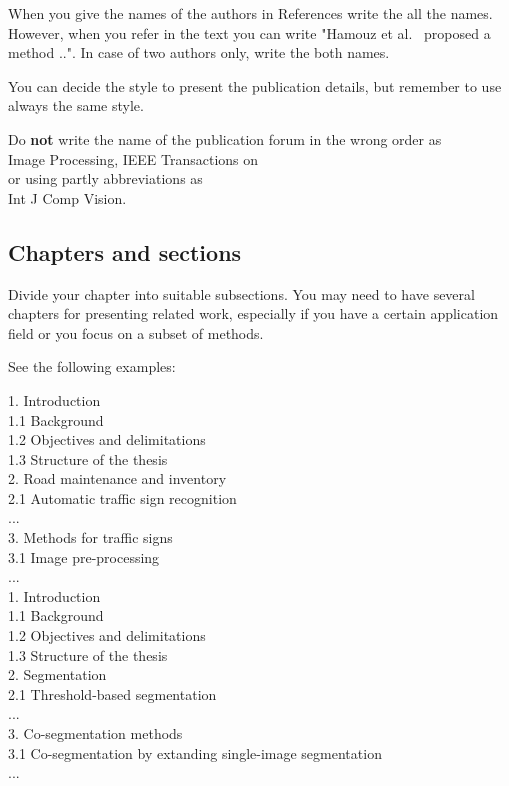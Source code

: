 \documentclass{lutmscthesis}[2017/10/03]
\begin{document}
When you give the names of the authors in References write the all the names. However, when you refer in the text you can write "Hamouz et al.~\cite{hamouz2005feature} proposed a method ..". In case of two authors only, write the both names. 

You can decide the style to present the publication details, but remember to use always the same style.

Do {\bf not} write the name of the publication forum in the wrong order as \\
Image Processing, IEEE Transactions on\\
or using partly abbreviations as\\
Int J Comp Vision.

\subsection{Chapters and sections}

Divide your chapter into suitable subsections. You may need to have several chapters for presenting related work, 
especially if you have a certain application field or you focus on a subset of methods.

See the following examples: 

1. Introduction\\
1.1 Background\\
1.2 Objectives and delimitations\\
1.3 Structure of the thesis\\
2. Road maintenance and inventory \\
2.1 Automatic traffic sign recognition\\
...\\
3. Methods for traffic signs\\
3.1 Image pre-processing\\
...\\

1. Introduction\\
1.1 Background\\
1.2 Objectives and delimitations\\
1.3 Structure of the thesis\\
2. Segmentation \\
2.1 Threshold-based segmentation\\
...\\
3. Co-segmentation methods \\
3.1 Co-segmentation by extanding single-image segmentation\\
...\\
\end{document}
